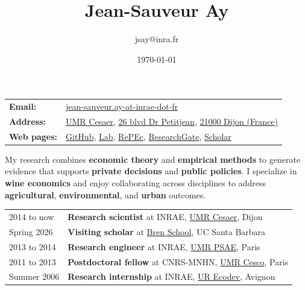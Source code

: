 \documentclass[12pt, a4paper]{./style}
\author{jsay@inra.fr}
\date{\today}
\title{Jean-Sauveur Ay}
\begin{document}
\maketitle

\label{sec:orgdf80468}

\begin{center}
\begin{tabular}{ll}
\textbf{Email:} & \href{mailto:jean-sauveur.ay@inrae.fr}{jean-sauveur.ay-at-inrae-dot-fr}\\
\textbf{Address:} & \href{https://www2.dijon.inrae.fr/cesaer/en/axis/}{UMR Cesaer}, \href{https://www.google.com/maps/?q\%3D47.3097819,5.0644835}{26 blvd Dr Petitjean}, \href{https://www.google.com/maps/place/21000+Dijon/}{21000 Dijon (France)}\\
\textbf{Web pages:} & \href{http://github.com/jsay/}{GitHub}, \href{https://cesaer.dijon.hub.inrae.fr/membres/personnel-scientifique/ay-jean-sauveur}{Lab}, \href{https://ideas.repec.org/e/pay77.html}{RePEc}, \href{https://www.researchgate.net/profile/Jean\_Sauveur\_Ay}{ResearchGate}, \href{https://scholar.google.fr/citations?user=arEwxlIAAAAJ\&hl=fr}{Scholar}\\
\end{tabular}
\end{center}
\label{sec:orgce67f61}
\vspace{.5cm}

My research combines \textbf{economic theory} and \textbf{empirical
methods} to generate evidence that supports \textbf{private
decisions} and \textbf{public policies}. I specialize in \textbf{wine
economics} and enjoy collaborating across disciplines to
address \textbf{agricultural}, \textbf{environmental}, and \textbf{urban}
outcomes.
\vspace{.5cm}
\label{sec:org215188c}

\begin{center}
\begin{tabular}{ll}
2014 to now & \textbf{Research scientist} at INRAE, \href{https://www2.dijon.inrae.fr/cesaer/en/axis/}{UMR Cesaer}, Dijon\\
Spring 2026 & \textbf{Visiting scholar} at \href{https://bren.ucsb.edu/}{Bren School}, UC Santa Barbara\\
2013 to 2014 & \textbf{Research engineer} at INRAE, \href{https://psae-saclay.fr/}{UMR PSAE}, Paris\\
2011 to 2013 & \textbf{Postdoctoral fellow} at CNRS-MNHN, \href{http://cesco.mnhn.fr/en}{UMR Cesco}, Paris\\
Summer 2006 & \textbf{Research internship} at INRAE, \href{https://ecodeveloppement.paca.hub.inrae.fr/}{UR Ecodev}, Avignon\\
\end{tabular}
\end{center}
\label{sec:org19e0511}
\end{document}

